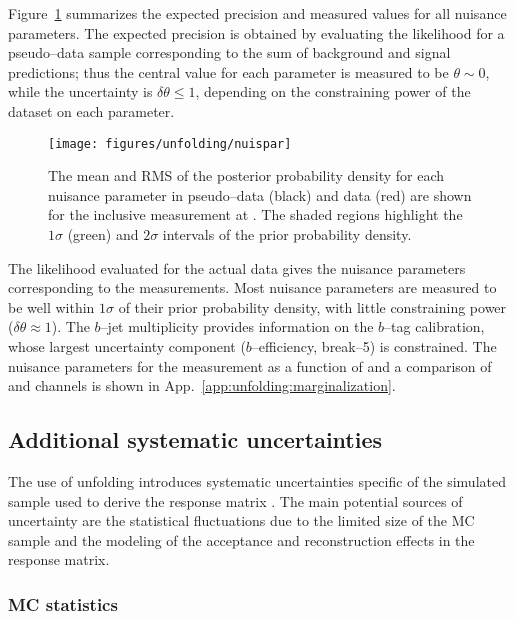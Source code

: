 Figure~\ref{fig:nuispar} summarizes the expected precision and measured
values for all nuisance parameters. The expected precision is obtained
by evaluating the likelihood for a pseudo--data sample corresponding
to the sum of background and signal predictions; thus the central
value for each parameter is measured to be $\theta\sim0$, while the
uncertainty is $\delta\theta\leq1$, depending on the constraining power of
the dataset on each parameter.
\begin{figure}[!htb]\centering
  \texttt{[image: figures/unfolding/nuispar]}
  \caption{The mean and RMS of the posterior probability density for
    each nuisance parameter in pseudo--data (black) and data
    (red) are shown for the inclusive \ac{} measurement at \eighttev{}. The
    shaded regions highlight the $1\sigma$ (green) and $2\sigma$
    intervals of the prior probability density.}
  \label{fig:nuispar}
\end{figure}
The likelihood evaluated for the actual data gives the nuisance
parameters corresponding to the measurements. 
Most nuisance parameters are measured to be well within $1\sigma$ of
their prior probability density, with little constraining power
($\delta\theta\approx1$). The $b$--jet multiplicity provides
information on the $b$--tag calibration, whose largest uncertainty
component ($b$--efficiency, break--5) is constrained. The nuisance
parameters for the measurement as a function of \mtt{} and a
comparison of \ejets{} and \mujets{} channels is shown in
App.~\ref{app:unfolding:marginalization}.

\subsection{Additional systematic uncertainties}

The use of unfolding introduces systematic uncertainties
specific of the \ttbar{} simulated sample used to derive the response
matrix \TrasfMatrix{}.
The main potential sources of uncertainty are the statistical fluctuations due
to the limited size of the MC sample and the modeling of the acceptance
and reconstruction effects in the response matrix.

\subsubsection{MC statistics}
\label{sec:mcstat}

